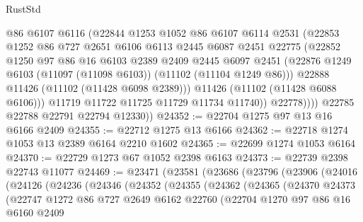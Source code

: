 \begin{lexlean}{RustStd}
\begin{coremodule}
                  @86
                  @6107
                  @6116
                  (@22844
                    @1253
                    @1052
                    @86
                    @6107
                    @6114
                    @2531
                    (@22853
                      @1252
                      @86
                      @727
                      @2651
                      @6106
                      @6113
                      @2445
                      @6087
                      @2451
                      @22775
                      (@22852
                        @1250
                        @97
                        @86
                        @16
                        @6103
                        @2389
                        @2409
                        @2445
                        @6097
                        @2451
                        (@22876 @1249 @6103 (@11097 (@11098 @6103)) (@11102 (@11104 @1249 @86)))
                        @22888
                        @11426
                        (@11102 (@11428 @6098 @2389)))
                      @11426
                      (@11102 (@11428 @6088 @6106)))
                    @11719
                    @11722
                    @11725
                    @11729
                    @11734
                    @11740))
                @22778))))
        @22785
        @22788
        @22791
        @22794
        @12330))
@24352 := @22704 @1275 @97 @13 @16 @6166 @2409
@24355 := @22712 @1275 @13 @6166
@24362 := @22718 @1274 @1053 @13 @2389 @6164 @2210 @1602
@24365 := @22699 @1274 @1053 @6164
@24370 := @22729 @1273 @67 @1052 @2398 @6163
@24373 := @22739 @2398 @22743 @11077
@24469 := @23471
    (@23581
      (@23686
        (@23796
          (@23906
            (@24016
              (@24126
                (@24236
                  (@24346
                    (@24352
                      (@24355
                        (@24362
                          (@24365
                            (@24370
                              @24373
                              (@22747
                                @1272
                                @86
                                @727
                                @2649
                                @6162
                                @22760
                                (@22704
                                  @1270
                                  @97
                                  @86
                                  @16
                                  @6160
                                  @2409

\end{coremodule}
\end{lexlean}
